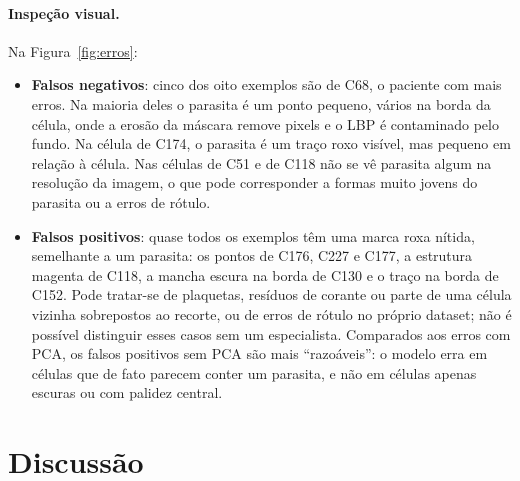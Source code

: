 \documentclass[11pt,a4paper]{article}
\begin{document}
\paragraph{Inspeção visual.} Na Figura~\ref{fig:erros}:
\begin{itemize}
  \item \textbf{Falsos negativos}: cinco dos oito exemplos são de C68, o paciente com mais erros. Na
        maioria deles o parasita é um ponto pequeno, vários na borda da célula, onde a erosão da
        máscara remove pixels e o LBP é contaminado pelo fundo. Na célula de C174, o parasita é um traço roxo visível, mas pequeno em
        relação à célula. Nas células de C51 e de C118 não se vê parasita algum na resolução da
        imagem, o que pode corresponder a formas muito jovens do parasita ou a erros de rótulo.
  \item \textbf{Falsos positivos}: quase todos os exemplos têm uma marca roxa nítida, semelhante a um
        parasita: os pontos de C176, C227 e C177, a estrutura magenta de C118, a mancha escura na
        borda de C130 e o traço na borda de C152. Pode tratar-se de plaquetas, resíduos de corante ou
        parte de uma célula vizinha sobrepostos ao recorte, ou de erros de rótulo no próprio dataset;
        não é possível distinguir esses casos sem um especialista. Comparados aos erros com PCA, os
        falsos positivos sem PCA são mais ``razoáveis'': o modelo erra em células que de fato parecem
        conter um parasita, e não em células apenas escuras ou com palidez central.
\end{itemize}

\section{Discussão}\label{sec:discussao}
\end{document}
